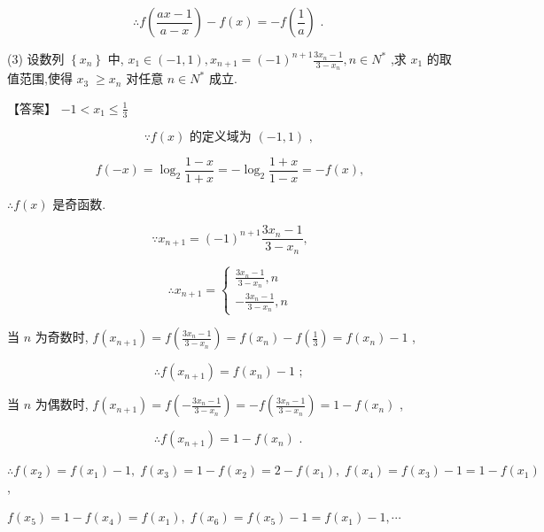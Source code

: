 \documentclass[10pt]{article}
\newcommand*\circled[1]{\tikz[baseline=(char.base)]{\node[shape=circle,draw,inner sep=1.5pt] (char) {\small #1};}}
\begin{document}
\[
\therefore f\left( \frac{{ax} - 1}{a - x}\right)  - f\left( x\right)  =  - f\left( \frac{1}{a}\right) \text{ . }
\]

(3) 设数列 \(\left\{  {x}_{n}\right\}\) 中, \({x}_{1} \in  \left( {-1,1}\right) ,{x}_{n + 1} = {\left( -1\right) }^{n + 1}\frac{3{x}_{n} - 1}{3 - {x}_{n}},n \in  {N}^{ * }\) ,求 \({x}_{1}\) 的取值范围,使得 \({x}_{3} \; \geq  {x}_{n}\) 对任意 \(n \in  {N}^{ * }\) 成立.

【答案】 \(- 1 < {x}_{1} \leq  \frac{1}{3}\)

\[
\because f\left( x\right) \text{ 的定义域为 }\left( {-1,1}\right) \text{ , }
\]

\[
f\left( {-x}\right)  = {\log }_{2}\frac{1 - x}{1 + x} =  - {\log }_{2}\frac{1 + x}{1 - x} =  - f\left( x\right) ,
\]

\(\therefore f\left( x\right)\) 是奇函数.

\[
\because {x}_{n + 1} = {\left( -1\right) }^{n + 1}\frac{3{x}_{n} - 1}{3 - {x}_{n}},
\]

\[
\therefore {x}_{n + 1} = \left\{  \begin{array}{l} \frac{3{x}_{n} - 1}{3 - {x}_{n}},n \\   - \frac{3{x}_{n} - 1}{3 - {x}_{n}},n \end{array}\right.
\]

 \circled{1} 当 \(n\) 为奇数时, \(f\left( {x}_{n + 1}\right)  = f\left( \frac{3{x}_{n} - 1}{3 - {x}_{n}}\right)  = f\left( {x}_{n}\right)  - f\left( \frac{1}{3}\right)  = f\left( {x}_{n}\right)  - 1\) ,

\[
\therefore f\left( {x}_{n + 1}\right)  = f\left( {x}_{n}\right)  - 1\text{ ; }
\]

 \circled{2} 当 \(n\) 为偶数时, \(f\left( {x}_{n + 1}\right)  = f\left( {-\frac{3{x}_{n} - 1}{3 - {x}_{n}}}\right)  =  - f\left( \frac{3{x}_{n} - 1}{3 - {x}_{n}}\right)  = 1 - f\left( {x}_{n}\right)\) ,

\[
\therefore f\left( {x}_{n + 1}\right)  = 1 - f\left( {x}_{n}\right) \text{ . }
\]

\(\therefore f\left( {x}_{2}\right)  = f\left( {x}_{1}\right)  - 1,\;f\left( {x}_{3}\right)  = 1 - f\left( {x}_{2}\right)  = 2 - f\left( {x}_{1}\right) ,\;f\left( {x}_{4}\right)  = f\left( {x}_{3}\right)  - 1 = 1 - f\left( {x}_{1}\right)\) ,

\(f\left( {x}_{5}\right)  = 1 - f\left( {x}_{4}\right)  = f\left( {x}_{1}\right) ,\;f\left( {x}_{6}\right)  = f\left( {x}_{5}\right)  - 1 = f\left( {x}_{1}\right)  - 1,\cdots\)
\end{document}
